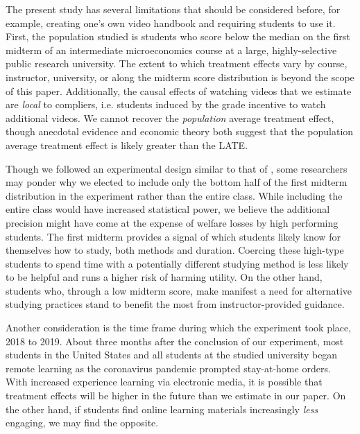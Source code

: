 \documentclass[12pt]{article}
\begin{document}
The present study has several limitations that should be considered before, for example, creating one's own video handbook and requiring students to use it. First, the population studied is students who score below the median on the first midterm of an intermediate microeconomics course at a large, highly-selective public research university. The extent to which treatment effects vary by course, instructor, university, or along the midterm score distribution is beyond the scope of this paper. Additionally, the causal effects of watching videos that we estimate are \textit{local} to compliers, i.e. students induced by the grade incentive to watch additional videos. We cannot recover the \textit{population} average treatment effect, though anecdotal evidence and economic theory both suggest that the population average treatment effect is likely greater than the LATE. %

Though we followed an experimental design similar to that of \textcite{dgm2010}, some researchers may ponder why we elected to include only the bottom half of the first midterm distribution in the experiment rather than the entire class. While including the entire class would have increased statistical power, we believe the additional precision might have come at the expense of welfare losses by high performing students. The first midterm provides a signal of which students likely know for themselves how to study, both methods and duration. Coercing these high-type students to spend time with a potentially different studying method is less likely to be helpful and runs a higher risk of harming utility. On the other hand, students who, through a low midterm score, make manifest a need for alternative studying practices stand to benefit the most from instructor-provided guidance.

Another consideration is the time frame during which the experiment took place, 2018 to 2019. About three months after the conclusion of our experiment, most students in the United States and all students at the studied university began remote learning as the coronavirus pandemic prompted stay-at-home orders. With increased experience learning via electronic media, it is possible that treatment effects will be higher in the future than we estimate in our paper. On the other hand, if students find online learning materials increasingly \textit{less} engaging, we may find the opposite.
\end{document}
